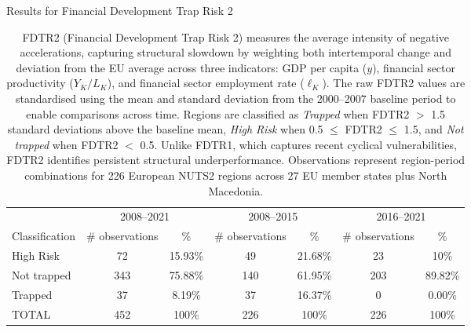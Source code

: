 \documentclass[a4paper,11pt,oneside]{article}
\begin{document}
\begin{table}%
\centering
\caption{Results for Financial Development Trap Risk 2}
\vspace{-2mm}
\caption*{\footnotesize FDTR2 (Financial Development Trap Risk 2) measures the average intensity of negative accelerations, capturing structural slowdown by weighting both intertemporal change and deviation from the EU average across three indicators: GDP per capita ($y$), financial sector productivity ($Y_K/L_K$), and financial sector employment rate ($\ell_K$). The raw FDTR2 values are standardised using the mean and standard deviation from the 2000--2007 baseline period to enable comparisons across time. Regions are classified as \textit{Trapped} when FDTR2 $>$ 1.5 standard deviations above the baseline mean, \textit{High Risk} when 0.5 $\leq$ FDTR2 $\leq$ 1.5, and \textit{Not trapped} when FDTR2 $<$ 0.5. Unlike FDTR1, which captures recent cyclical vulnerabilities, FDTR2 identifies persistent structural underperformance. Observations represent region-period combinations for 226 European NUTS2 regions across 27 EU member states plus North Macedonia.}
\label{tbl:results_fdtr_2}
\footnotesize
\begin{tabular}{lcccccc}
\toprule
               & \multicolumn{2}{c}{2008--2021} & \multicolumn{2}{c}{2008--2015}    & \multicolumn{2}{c}{2016--2021}    \\
\cmidrule(r){2-3}
\cmidrule(r){4-5}
\cmidrule(r){6-7}
Classification & \# observations    & \%         & \# observations & \%      & \# observations & \%      \\
\midrule
High Risk      & 72                        & 15.93\%    & 49                     & 21.68\% & 23                     & 10\%    \\
Not trapped    & 343                       & 75.88\%    & 140                    & 61.95\% & 203                    & 89.82\% \\
Trapped        & 37                        & 8.19\%     & 37                     & 16.37\% & 0                      & 0.00\%  \\
\midrule
TOTAL          & 452                       & 100\%      & 226                    & 100\%   & 226                    & 100\%   \\
\bottomrule
\end{tabular}
\end{table}




\pagebreak
\clearpage
\end{document}
